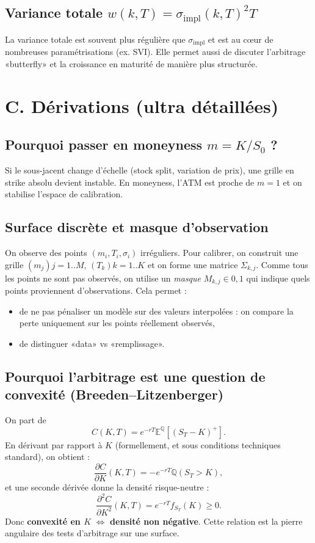 \documentclass[11pt,a4paper]{report}
\theoremstyle{definition}
\theoremstyle{plain}
\theoremstyle{remark}
\newcommand{\E}{\mathbb{E}}
\newcommand{\1}{\mathbf{1}}
\newcommand{\Qmeas}{\mathbb{Q}}
\begin{document}
\subsection*{Variance totale $w(k,T)=\sigma_{\text{impl}}(k,T)^2T$}
La variance totale est souvent plus régulière que $\sigma_{\text{impl}}$ et est au c\oe{}ur de nombreuses paramétrisations (ex. SVI).
Elle permet aussi de discuter l'arbitrage «butterfly» et la croissance en maturité de manière plus structurée.



\section{C. Dérivations (ultra détaillées)}
\subsection*{Pourquoi passer en moneyness $m=K/S_0$ ?}
Si le sous-jacent change d'échelle (stock split, variation de prix), une grille en strike absolu devient instable. En moneyness, l'ATM est proche de $m=1$ et on stabilise l'espace de calibration.

\subsection*{Surface discrète et masque d'observation}
On observe des points $(m_i,T_i,\sigma_i)$ irréguliers. Pour calibrer, on construit une grille $(m_j){j=1..M}$, $(T_k){k=1..K}$ et on forme une matrice $\Sigma_{k,j}$.
Comme tous les points ne sont pas observés, on utilise un \emph{masque} $M_{k,j}\in{0,1}$ qui indique quels points proviennent d'observations. Cela permet :
\begin{itemize}[leftmargin=*]
\item de ne pas pénaliser un modèle sur des valeurs interpolées : on compare la perte uniquement sur les points réellement observés,
\item de distinguer «data» vs «remplissage».
\end{itemize}

\subsection*{Pourquoi l'arbitrage est une question de convexité (Breeden--Litzenberger)}
On part de
\[
C(K,T)=e^{-rT}\E^{\Qmeas}[(S_T-K)^+].
\]
En dérivant par rapport à $K$ (formellement, et sous conditions techniques standard), on obtient :
\[
\frac{\partial C}{\partial K}(K,T)=-e^{-rT}\Qmeas(S_T>K),
\]
et une seconde dérivée donne la densité risque-neutre :
\[
\frac{\partial^2 C}{\partial K^2}(K,T)=e^{-rT} f_{S_T}(K)\ge 0.
\]
Donc \textbf{convexité en $K$} $\Longleftrightarrow$ \textbf{densité non négative}.
Cette relation est la pierre angulaire des tests d'arbitrage sur une surface.
\end{document}
